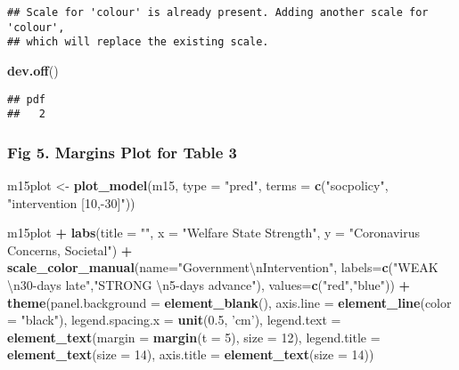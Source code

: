 \documentclass[
]{article}
\newenvironment{Shaded}{\begin{snugshade}}{\end{snugshade}}
\newcommand{\CharTok}[1]{\textcolor[rgb]{0.31,0.60,0.02}{#1}}
\newcommand{\DataTypeTok}[1]{\textcolor[rgb]{0.13,0.29,0.53}{#1}}
\newcommand{\DecValTok}[1]{\textcolor[rgb]{0.00,0.00,0.81}{#1}}
\newcommand{\FloatTok}[1]{\textcolor[rgb]{0.00,0.00,0.81}{#1}}
\newcommand{\KeywordTok}[1]{\textcolor[rgb]{0.13,0.29,0.53}{\textbf{#1}}}
\newcommand{\NormalTok}[1]{#1}
\newcommand{\OperatorTok}[1]{\textcolor[rgb]{0.81,0.36,0.00}{\textbf{#1}}}
\newcommand{\StringTok}[1]{\textcolor[rgb]{0.31,0.60,0.02}{#1}}
\begin{document}
\begin{verbatim}
## Scale for 'colour' is already present. Adding another scale for 'colour',
## which will replace the existing scale.
\end{verbatim}

\begin{Shaded}
\begin{Highlighting}[]
\KeywordTok{dev.off}\NormalTok{()}
\end{Highlighting}
\end{Shaded}

\begin{verbatim}
## pdf 
##   2
\end{verbatim}

\hypertarget{fig-5.-margins-plot-for-table-3}{%
\subsubsection{Fig 5. Margins Plot for Table
3}\label{fig-5.-margins-plot-for-table-3}}

\begin{Shaded}
\begin{Highlighting}[]
\NormalTok{m15plot <-}\StringTok{ }\KeywordTok{plot_model}\NormalTok{(m15, }\DataTypeTok{type =} \StringTok{"pred"}\NormalTok{, }\DataTypeTok{terms =} \KeywordTok{c}\NormalTok{(}\StringTok{"socpolicy"}\NormalTok{, }\StringTok{"intervention [10,-30]"}\NormalTok{)) }

\NormalTok{m15plot }\OperatorTok{+}\StringTok{ }\KeywordTok{labs}\NormalTok{(}\DataTypeTok{title =} \StringTok{""}\NormalTok{, }\DataTypeTok{x =} \StringTok{"Welfare State Strength"}\NormalTok{, }\DataTypeTok{y =} \StringTok{"Coronavirus Concerns, Societal"}\NormalTok{) }\OperatorTok{+}
\StringTok{  }\KeywordTok{scale_color_manual}\NormalTok{(}\DataTypeTok{name=}\StringTok{"Government}\CharTok{\textbackslash{}n}\StringTok{Intervention"}\NormalTok{,}
                       \DataTypeTok{labels=}\KeywordTok{c}\NormalTok{(}\StringTok{"WEAK }\CharTok{\textbackslash{}n}\StringTok{30-days late"}\NormalTok{,}\StringTok{"STRONG }\CharTok{\textbackslash{}n}\StringTok{5-days advance"}\NormalTok{),}
                       \DataTypeTok{values=}\KeywordTok{c}\NormalTok{(}\StringTok{"red"}\NormalTok{,}\StringTok{"blue"}\NormalTok{)) }\OperatorTok{+}
\StringTok{    }\KeywordTok{theme}\NormalTok{(}\DataTypeTok{panel.background =} \KeywordTok{element_blank}\NormalTok{(),}
          \DataTypeTok{axis.line =} \KeywordTok{element_line}\NormalTok{(}\DataTypeTok{color =} \StringTok{"black"}\NormalTok{),}
          \DataTypeTok{legend.spacing.x =} \KeywordTok{unit}\NormalTok{(}\FloatTok{0.5}\NormalTok{, }\StringTok{'cm'}\NormalTok{),}
          \DataTypeTok{legend.text =} \KeywordTok{element_text}\NormalTok{(}\DataTypeTok{margin =} \KeywordTok{margin}\NormalTok{(}\DataTypeTok{t =} \DecValTok{5}\NormalTok{), }\DataTypeTok{size =} \DecValTok{12}\NormalTok{),}
          \DataTypeTok{legend.title =} \KeywordTok{element_text}\NormalTok{(}\DataTypeTok{size =} \DecValTok{14}\NormalTok{),}
          \DataTypeTok{axis.title =} \KeywordTok{element_text}\NormalTok{(}\DataTypeTok{size =} \DecValTok{14}\NormalTok{))}
\end{Highlighting}
\end{Shaded}
\end{document}
